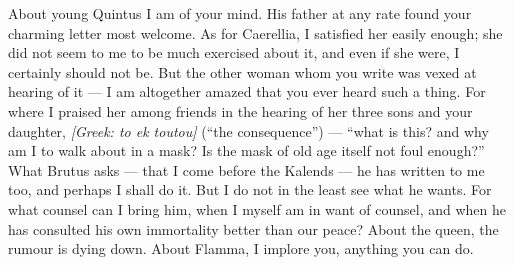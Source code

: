  About young Quintus I am of your mind. His father at any rate found your charming letter most welcome. As for Caerellia, I satisfied her easily enough; she did not seem to me to be much exercised about it, and even if she were, I certainly should not be. But the other woman whom you write was vexed at hearing of it --- I am altogether amazed that you ever heard such a thing. For where I praised her among friends in the hearing of her three sons and your daughter, \textit{[Greek: to ek toutou]} (``the consequence'') --- ``what is this? and why am I to walk about in a mask? Is the mask of old age itself not foul enough?'' What Brutus asks --- that I come before the Kalends --- he has written to me too, and perhaps I shall do it. But I do not in the least see what he wants. For what counsel can I bring him, when I myself am in want of counsel, and when he has consulted his own immortality better than our peace? About the queen, the rumour is dying down. About Flamma, I implore you, anything you can do.
